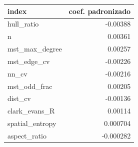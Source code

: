 \begin{tabular}{lr}
\hline
index & coef. padronizado \\
\hline
hull\_ratio & -0.00388 \\
n & 0.00361 \\
mst\_max\_degree & 0.00257 \\
mst\_edge\_cv & -0.00226 \\
nn\_cv & -0.00216 \\
mst\_odd\_frac & 0.00205 \\
dist\_cv & -0.00136 \\
clark\_evans\_R & 0.00114 \\
spatial\_entropy & 0.000704 \\
aspect\_ratio & -0.000282 \\
\hline
\end{tabular}
